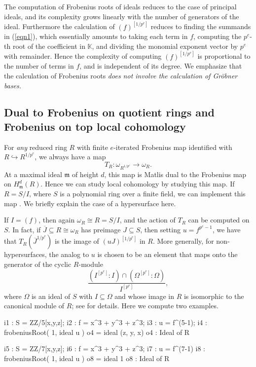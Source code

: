 \documentclass{amsart}
\newcommand{\fram}{\mathfrak{m}}
\begin{document}
The computation of Frobenius roots of ideals reduces to the case of principal ideals, and its complexity grows linearly with the number of generators of the ideal.
Furthermore the calculation of  $(f)^{[1/p^e]}$ reduces to finding the summands in (\ref{eqn1}), which essentially amounts to
taking each term in $f$, computing the $p^e$-th root of the coefficient in $\mathbb{K}$, and dividing the monomial exponent vector by $p^e$ with remainder.
Hence the complexity of computing $(f)^{[1/p^e]}$ is proportional to the number of terms in $f$, and is independent of its degree.
We emphasize that the calculation of Frobenius roots \emph{does not involve the calculation of Gr\"obner bases.}

\subsection{Dual to Frobenius on quotient rings and Frobenius on top local cohomology}
\label{subsec.DualToFrobeniusOnQuotientRings}
For \emph{any} reduced ring $R$ with finite $e$-iterated Frobenius map identified with $R \hookrightarrow R^{1/p^e}$, we always have a map
\[
T_R : \omega_{R^{1/p^e}} \to \omega_R.
\]
At a maximal ideal $\fram$ of height $d$, this map is Matlis dual to the Frobenius map on $H^d_{\fram}(R)$.
Hence we can study local cohomology by studying this map.
If $R = S/I$, where $S$ is a polynomial ring over a finite field, we can implement this map \cite{FedderFPureRat, KatzmanParameterTestIdealOfCMRings}.  We briefly explain the case of a hypersurface here.

If $I = (f)$, then again $\omega_R \cong R = S/I$, and the action of $T_R$ can be computed on $S$.  In fact, if $\overline{J} \subseteq R \cong \omega_R$ has preimage  $J \subseteq S$,
then setting $u = f^{p^e-1}$, we have that $T_R({\overline J}^{1/p^e})$ is the image of $(u J)^{[1/p^e]}$ in $R$.
More generally, for non-hypersurfaces, the analog to $u$ is chosen to be an element that maps onto the generator of the cyclic $R$-module
\[
\frac{(I^{[p^e]} : I) \cap (\Omega^{[p^e]} : \Omega)}{ I^{[p^e]}},
\]
where $\Omega$ is an ideal of $S$ with $I\subseteq \Omega$ and whose image in $R$ is isomorphic to the canonical module of $R$; see \cite{KatzmanParameterTestIdealOfCMRings} for details.
Here we compute two examples.

\medskip
{\small
\begin{MyVerbatim}
i1 : S = ZZ/5[x,y,z];
i2 : f = x^3 + y^3 + z^3;
i3 : u = f^(5-1);
i4 : frobeniusRoot( 1, ideal u )
o4 = ideal (z, y, x)
o4 : Ideal of R

i5 : S = ZZ/7[x,y,z];
i6 : f = x^3 + y^3 + z^3;
i7 : u = f^(7-1)
i8 : frobeniusRoot( 1, ideal u )
o8 = ideal 1
o8 : Ideal of R
\end{MyVerbatim}
}\medskip
\end{document}
